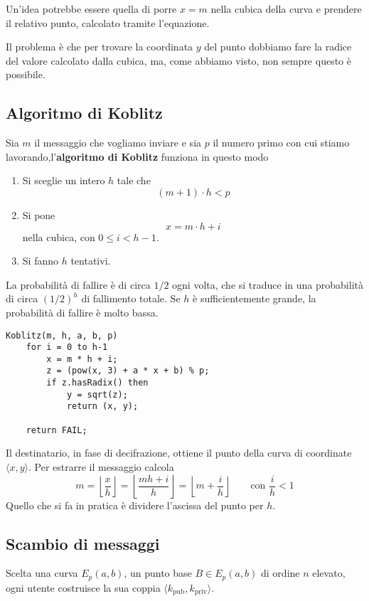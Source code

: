 Un'idea potrebbe essere quella di porre $x = m$ nella cubica della curva e prendere il relativo punto, calcolato
tramite l'equazione.

Il problema \`e che per trovare la coordinata $y$ del punto dobbiamo fare la radice del valore calcolato dalla
cubica, ma, come abbiamo visto, non sempre questo \`e possibile.

\subsection{Algoritmo di Koblitz}
Sia $m$ il messaggio che vogliamo inviare e sia $p$ il numero primo con cui stiamo lavorando,l'\textbf{algoritmo
	di Koblitz} funziona in questo modo
\begin{enumerate}
	\item Si sceglie un intero $h$ tale che
	      \[ (m + 1) \cdot h < p \]
	\item Si pone
	      \[ x = m \cdot h + i \]
	      nella cubica, con $0 \leq i < h-1$.
	\item Si fanno $h$ tentativi.
\end{enumerate}
La probabilit\`a di fallire \`e di circa $1/2$ ogni volta, che si traduce in una probabilit\`a di circa $(1/2)^h$
di fallimento totale. Se $h$ \`e sufficientemente grande, la probabilit\`a di fallire \`e molto bassa.

\begin{lstlisting}[style=pseudo-style]
Koblitz(m, h, a, b, p)
	for i = 0 to h-1
		x = m * h + i;
		z = (pow(x, 3) + a * x + b) % p;
		if z.hasRadix() then 
			y = sqrt(z);
			return (x, y);

	return FAIL;
\end{lstlisting}
Il destinatario, in fase di decifrazione, ottiene il punto della curva di coordinate $\langle x, y \rangle$. Per
estrarre il messaggio calcola
\[
	m = \left\lfloor \frac{x}{h} \right\rfloor  =
	\left\lfloor \frac{mh + i}{h} \right\rfloor =
	\left\lfloor m + \frac{i}{h} \right\rfloor
	\quad \quad \text{con } \frac{i}{h} < 1
\]
Quello che si fa in pratica \`e dividere l'ascissa del punto per $h$.

\subsection{Scambio di messaggi}
Scelta una curva $E_p(a, b)$, un punto base $B \in E_p(a, b)$ di ordine $n$ elevato, ogni utente costruisce la sua
coppia $\langle k_\text{pub}, k_\text{priv} \rangle$.

